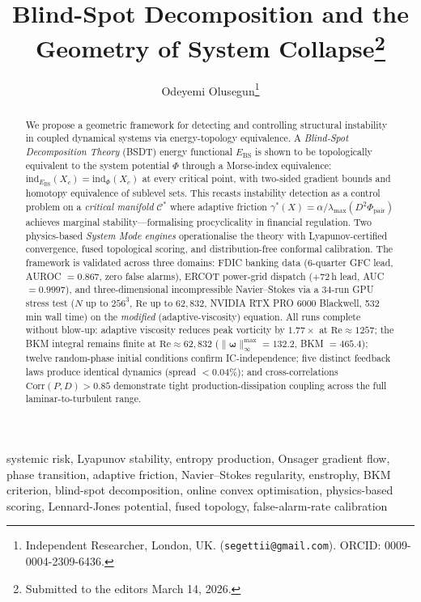 \documentclass[final]{siamltex}
\title{Blind-Spot Decomposition and the Geometry of System Collapse\thanks{Submitted to the editors March 14, 2026.}}
\author{Odeyemi Olusegun\thanks{Independent Researcher, London, UK.
(\texttt{segettii@gmail.com}).
ORCID: 0009-0004-2309-6436.}}
\newcommand{\Ebs}{E_{\mathrm{BS}}}
\newcommand{\Cman}{\mathcal{C}^*}
\newcommand{\lmax}{\lambda_{\max}}
\begin{document}
\maketitle

\pagestyle{myheadings}
\thispagestyle{plain}

\begin{abstract}
We propose a geometric framework for detecting and controlling
structural instability in coupled dynamical systems via
energy-topology equivalence.
A \emph{Blind-Spot Decomposition Theory} (BSDT) energy functional
\cite{odeyemi2025bsdt} $\Ebs$ is shown to be topologically
equivalent to the system potential $\Phi$ through a Morse-index
equivalence: $\mathrm{ind}_{\Ebs}(X_c) = \mathrm{ind}_\Phi(X_c)$
at every critical point, with two-sided gradient bounds and homotopy
equivalence of sublevel sets.
This recasts instability detection as a control problem on a
\emph{critical manifold} $\Cman$ where adaptive friction
$\gamma^*(X)=\alpha/\lmax(D^2\Phi_{\mathrm{pair}})$ achieves
marginal stability---formalising procyclicality in financial
regulation.
Two physics-based \emph{System Mode engines} operationalise the
theory with Lyapunov-certified convergence, fused topological
scoring, and distribution-free conformal calibration.
The framework is validated across three domains:
FDIC banking data (6-quarter GFC lead, AUROC $= 0.867$,
zero false alarms), ERCOT power-grid dispatch ($+72$\,h lead,
AUC $= 0.9997$), and three-dimensional incompressible
Navier--Stokes via a 34-run GPU stress test
($N$ up to $256^3$, $\mathrm{Re}$ up to $62{,}832$,
NVIDIA RTX PRO 6000 Blackwell, 532\,min wall time)
on the \emph{modified} (adaptive-viscosity) equation.
All runs complete without blow-up: adaptive viscosity
reduces peak vorticity by $1.77\times$ at
$\mathrm{Re}\approx 1257$; the BKM integral remains finite
at $\mathrm{Re}\approx 62{,}832$
($\|\bm{\omega}\|_\infty^{\max}=132.2$, BKM $=465.4$);
twelve random-phase initial conditions confirm IC-independence;
five distinct feedback laws produce identical dynamics
(spread $< 0.04\%$); and cross-correlations
$\mathrm{Corr}(P,D)>0.85$ demonstrate tight
production-dissipation coupling across the full
laminar-to-turbulent range.
\end{abstract}

\begin{keywords}
systemic risk, Lyapunov stability, entropy production, Onsager
gradient flow, phase transition, adaptive friction,
Navier--Stokes regularity, enstrophy, BKM criterion, blind-spot decomposition,
online convex optimisation, physics-based scoring,
Lennard-Jones potential, fused topology,
false-alarm-rate calibration
\end{keywords}
\end{document}
